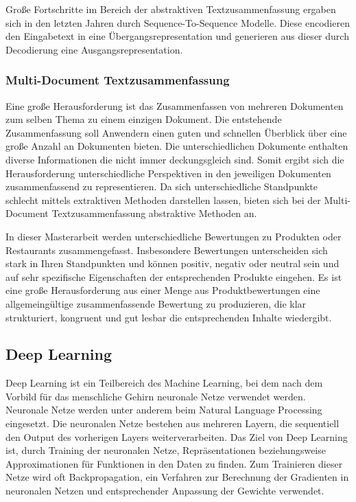 Große Fortschritte im Bereich der abstraktiven Textzusammenfassung ergaben sich in den letzten Jahren durch Sequence-To-Sequence Modelle. Diese encodieren den Eingabetext in eine Übergangsrepresentation und generieren aus dieser durch Decodierung eine Ausgangsrepresentation.

\subsubsection{Multi-Document Textzusammenfassung}
Eine große Herausforderung ist das Zusammenfassen von mehreren Dokumenten zum selben Thema zu einem einzigen Dokument. 
Die entstehende Zusammenfassung soll Anwendern einen guten und schnellen Überblick über eine große Anzahl an Dokumenten bieten. 
Die unterschiedlichen Dokumente enthalten diverse Informationen die nicht immer deckungsgleich sind. 
Somit ergibt sich die Herausforderung unterschiedliche Perspektiven in den jeweiligen Dokumenten zusammenfassend zu representieren.
Da sich unterschiedliche Standpunkte schlecht mittels extraktiven Methoden darstellen lassen, bieten sich bei der Multi-Document Textzusammenfassung abstraktive Methoden an.

In dieser Masterarbeit werden unterschiedliche Bewertungen zu Produkten oder Restaurants zusammengefasst. Insbesondere Bewertungen unterscheiden sich stark in Ihren Standpunkten und können positiv, negativ oder neutral sein und auf sehr spezifische Eigenschaften der entsprechenden Produkte eingehen.
Es ist eine große Herausforderung aus einer Menge aus Produktbewertungen eine allgemeingültige zusammenfassende Bewertung zu produzieren, die klar strukturiert, kongruent und gut lesbar die entsprechenden Inhalte wiedergibt.

\subsection{Deep Learning}
Deep Learning ist ein Teilbereich des Machine Learning, bei dem nach dem Vorbild für das menschliche Gehirn neuronale Netze verwendet werden. 
Neuronale Netze werden unter anderem beim Natural Language Processing eingesetzt. 
Die neuronalen Netze bestehen aus mehreren Layern, die sequentiell den Output des vorherigen Layers weiterverarbeiten. 
Das Ziel von Deep Learning ist, durch Training der neuronalen Netze, Repräsentationen beziehungsweise Approximationen für Funktionen in den Daten zu finden.
Zum Trainieren dieser Netze wird oft Backpropagation, ein Verfahren zur Berechnung der Gradienten in neuronalen Netzen und entsprechender Anpassung der Gewichte verwendet.

